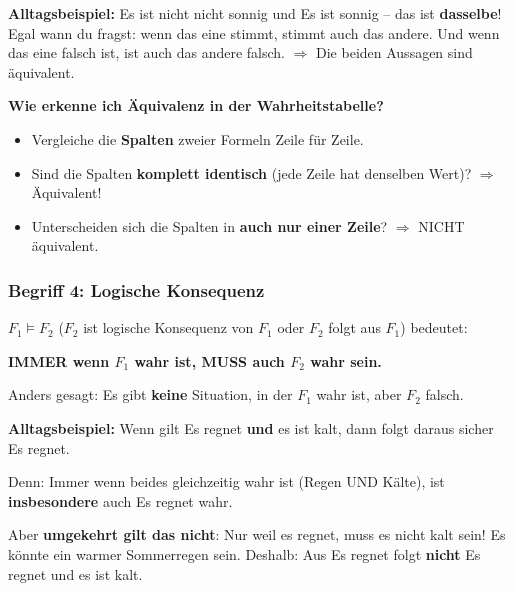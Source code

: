 \documentclass[a4paper,12pt]{article}
\begin{document}
\begin{analogie}
\textbf{Alltagsbeispiel:} \glqq Es ist nicht nicht sonnig\grqq{} und \glqq Es ist sonnig\grqq{} -- das ist \textbf{dasselbe}! Egal wann du fragst: wenn das eine stimmt, stimmt auch das andere. Und wenn das eine falsch ist, ist auch das andere falsch. $\Rightarrow$ Die beiden Aussagen sind \"aquivalent.
\end{analogie}

\textbf{Wie erkenne ich \"Aquivalenz in der Wahrheitstabelle?}
\begin{itemize}
\item Vergleiche die \textbf{Spalten} zweier Formeln Zeile f\"ur Zeile.
\item Sind die Spalten \textbf{komplett identisch} (jede Zeile hat denselben Wert)? $\Rightarrow$ \"Aquivalent!
\item Unterscheiden sich die Spalten in \textbf{auch nur einer Zeile}? $\Rightarrow$ NICHT \"aquivalent.
\end{itemize}

\bigskip

\subsubsection*{Begriff 4: Logische Konsequenz}

\begin{merkbox}
$F_1 \models F_2$ (\glqq$F_2$ ist logische Konsequenz von $F_1$\grqq{} oder \glqq$F_2$ folgt aus $F_1$\grqq{}) bedeutet:

\textbf{IMMER wenn $F_1$ wahr ist, MUSS auch $F_2$ wahr sein.}

Anders gesagt: Es gibt \textbf{keine} Situation, in der $F_1$ wahr ist, aber $F_2$ falsch.
\end{merkbox}

\begin{analogie}
\textbf{Alltagsbeispiel:} Wenn gilt \glqq Es regnet \textbf{und} es ist kalt\grqq{}, dann folgt daraus sicher \glqq Es regnet\grqq{}.

Denn: Immer wenn beides gleichzeitig wahr ist (Regen UND K\"alte), ist \textbf{insbesondere} auch \glqq Es regnet\grqq{} wahr.

\smallskip
Aber \textbf{umgekehrt gilt das nicht}: Nur weil es regnet, muss es nicht kalt sein! Es k\"onnte ein warmer Sommerregen sein. Deshalb: Aus \glqq Es regnet\grqq{} folgt \textbf{nicht} \glqq Es regnet und es ist kalt\grqq{}.
\end{analogie}
\end{document}

